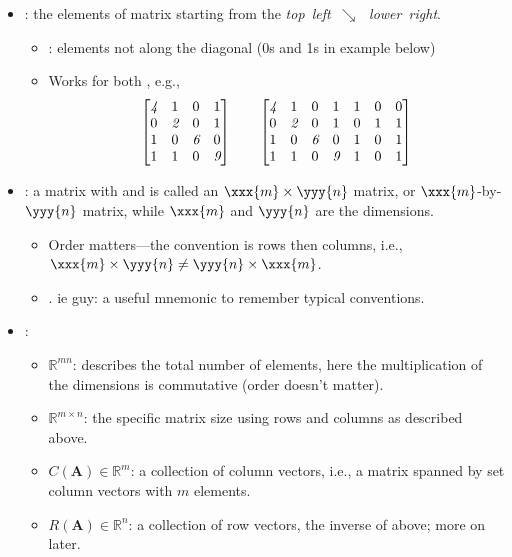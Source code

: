 \begin{itemize}
  \item {}: the elements of matrix starting from the \emph{top~left~\(\searrow \, \)~lower~right}.
    \begin{itemize}
      \item {}: elements not along the diagonal (0s and 1s in example below)
      \item Works for both \hyperref[Square and Rectangular Matrices]{}, e.g.,
      \[%
      \begin{bmatrix}
        \emph{4} & 1 & 0 & 1\\
        0 & \emph{2} & 0 & 1\\
        1 & 0 & \emph{6} & 0\\
        1 & 1 & 0 & \emph{9} 
      \end{bmatrix}
      \qquad
      \begin{bmatrix}
        \emph{4} & 1 & 0 & 1 & 1 & 0 & 0 \\
        0 & \emph{2} & 0 & 1 & 0 & 1 & 1 \\
        1 & 0 & \emph{6} & 0 & 1 & 0 & 1 \\
        1 & 1 & 0 & \emph{9} & 1 & 0 & 1
      \end{bmatrix}
      \]%
    \end{itemize}
  \item {}: a matrix with  and  is called an \(\xxx{m} \times \yyy{n}\) matrix, or \(\xxx{m}\)-by-\(\yyy{n}\) matrix, while \(\xxx{m}\) and \(\yyy{n}\) are the dimensions.
    \begin{itemize}
      \item Order matters---the convention is rows then columns, i.e., \(\xxx{m} \times \yyy{n} \neq \yyy{n} \times \xxx{m} \).
      \item {}. ie guy: a useful mnemonic to remember typical conventions.
    \end{itemize}
  \item {}: 
    \begin{itemize}
      \item \(\mathbb{R}^{mn}\): describes the total number of elements, here the multiplication of the dimensions is commutative (order doesn't matter). 
      \item \(\mathbb{R}^{m \times n}\): the specific matrix size using rows and columns as described above.
      \item \(C(\bm{A}) \in \mathbb{R}^m\): a collection of column vectors, i.e., a matrix spanned by set column vectors with \(m\) elements.
      \item \(R(\bm{A}) \in \mathbb{R}^n\): a collection of row vectors, the inverse of above; more on \hyperref[Column Space]{} later.
    \end{itemize}


\end{itemize}
